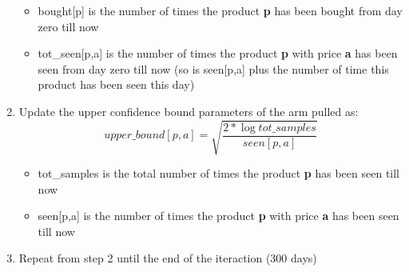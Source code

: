 \begin{enumerate}
\begin{itemize}
            \item bought[p] is the number of times the product {\bf p} has been bought from day zero till now
            \item tot\_seen[p,a] is the number of times the product {\bf p} with price {\bf a} has been seen from day zero till now (so is seen[p,a] plus the number of time this product has been seen this day)
        \end{itemize}
    \item Update the upper confidence bound parameters of the arm pulled as:
        \begin{equation}
            upper\_bound[p,a] = \sqrt{\frac{2 * \log tot\_samples}{seen[p,a]}}
        \end{equation}
        \begin{itemize}
            \item tot\_samples is the total number of times the product {\bf p} has been seen till now
            \item seen[p,a] is the number of times the product {\bf p} with price {\bf a} has been seen  till now
        \end{itemize}
    \item Repeat from step 2 until the end of the iteraction (300 days)
\end{enumerate}
